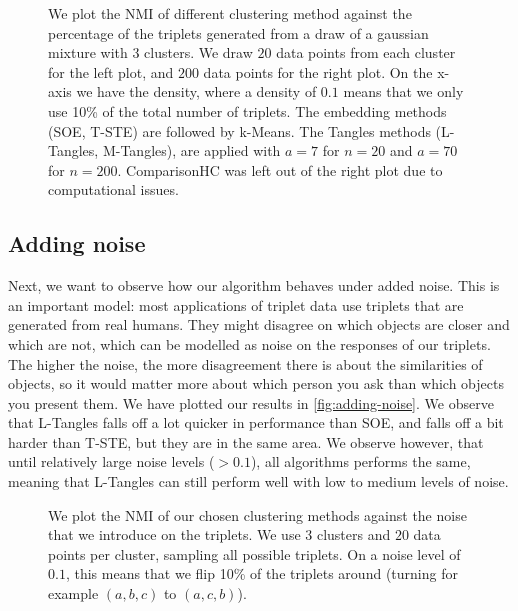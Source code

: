 \onecolumn
\begin{figure}[ht]
    \centering
    \caption{
        We plot the NMI of different clustering method against the percentage of the triplets generated from a draw of a gaussian mixture with $3$ clusters. 
        We draw $20$ data points from each cluster for the left plot, and $200$ data points for the right plot.
        On the x-axis we have the density, where a density of $0.1$ means that we only use 10\% of the total number of triplets. The embedding methods (SOE, T-STE) are 
        followed by k-Means. The Tangles methods (L-Tangles, M-Tangles), are applied with $a=7$ for $n=20$ and $a=70$ for $n=200$. ComparisonHC was left out of the right plot due to computational issues.}
    \label{fig:density-change}
\end{figure}


\subsection{Adding noise}\label{sec:adding-noise}
Next, we want to observe how our algorithm behaves under added noise. This is an important model: most applications of triplet data use triplets that are generated from
real humans. They might disagree on which objects are closer and which are not, which can be modelled as noise on the responses of our triplets. The higher the noise, 
the more disagreement there is about the similarities of objects, so it would matter more about which person you ask than which objects you present them. 
We have plotted our results in \autoref{fig:adding-noise}. 
We observe that L-Tangles falls off a lot quicker in performance than SOE, and falls off a bit harder than T-STE, but they are in the same area. We observe however, that until
relatively large noise levels ($>0.1$), all algorithms performs the same, meaning that L-Tangles can still perform well with low to medium levels of noise.

\begin{figure}[ht]
    \centering
    \resizebox{0.7\textwidth}{!}{}
    \caption{
        We plot the NMI of our chosen clustering methods against the noise that we introduce on the triplets.  We use $3$ clusters and $20$ data points per cluster, sampling all possible triplets. On a noise level of $0.1$, this means that we flip 10\% of the triplets around (turning for example $(a,b,c)$ to $(a,c,b)$). 
    }
    \label{fig:adding-noise}
\end{figure}

